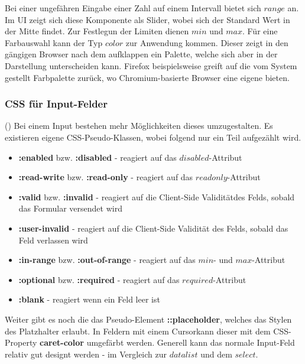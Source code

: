 Bei einer ungefähren Eingabe einer Zahl auf einem Intervall bietet sich $range$ an.
Im UI zeigt sich diese Komponente als Slider, wobei sich der Standard Wert in der Mitte findet.
Zur Festlegun der Limiten dienen $min$ und $max$.
Für eine Farbauswahl kann der Typ $color$ zur Anwendung kommen. 
Dieser zeigt in den gängigen Browser nach dem aufklappen ein Palette, welche sich aber in der Darstellung unterscheiden kann. 
Firefox beispielsweise greift auf die vom System gestellt Farbpalette zurück, wo Chromium-basierte Browser eine eigene bieten.

\subsubsection{{\color{dgray} CSS für Input-Felder}}
(\cite{inputMdn}) Bei einem Input bestehen mehr Möglichkeiten dieses umzugestalten.
Es existieren eigene CSS-Pseudo-Klassen, wobei folgend nur ein Teil aufgezählt wird.

\begin{itemize}
    \item \textbf{:enabled} bzw. \textbf{:disabled} - reagiert auf das $disabled$-Attribut
    \item \textbf{:read-write} bzw. \textbf{:read-only} - reagiert auf das $readonly$-Attribut
    \item \textbf{:valid} bzw. \textbf{:invalid} - reagiert auf die Client-Side Validität\footnotemark des Felds, sobald das Formular versendet wird
    \item \textbf{:user-invalid} - reagiert auf die Client-Side Validität des Felds, sobald das Feld verlassen wird
    \item \textbf{:in-range} bzw. \textbf{:out-of-range} - reagiert auf das $min$- und $max$-Attribut
    \item \textbf{:optional} bzw. \textbf{:required} - reagiert auf das $required$-Attribut
    \item \textbf{:blank} - reagiert wenn ein Feld leer ist
\end{itemize}

Weiter gibt es noch die das Pseudo-Element \textbf{::placeholder}, welches das Stylen des Platzhalter erlaubt.
In Feldern mit einem Cursor\footnotemark kann dieser mit dem CSS-Property \textbf{caret-color} umgefärbt werden.
Generell kann das normale Input-Feld relativ gut designt werden - im Vergleich zur $datalist$ und dem $select$.

